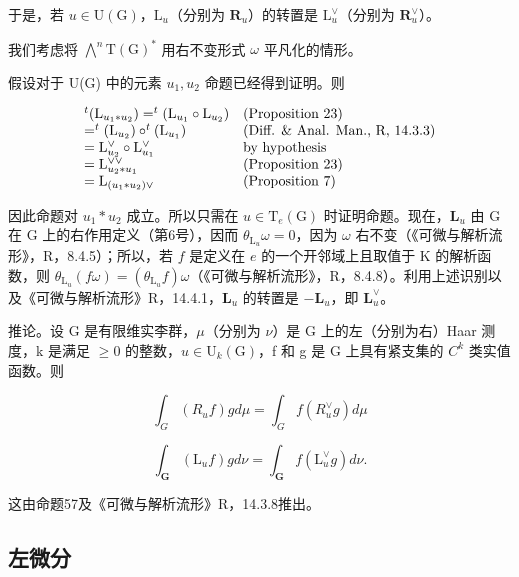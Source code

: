 于是，若 \(u \in \mathrm{U}(\mathrm{G})\)，\(\mathrm{L}_u\)（分别为 \(\mathbf{R}_u\)）的转置是 \(\mathrm{L}_u^\vee\)（分别为 \(\mathbf{R}_u^\vee\)）。

我们考虑将 \(\bigwedge^{n}\mathrm{T}(\mathrm{G})^{*}\) 用右不变形式 \(\omega\) 平凡化的情形。

假设对于 U(G) 中的元素 \(u_{1}, u_{2}\) 命题已经得到证明。则

\[
\begin{array}{l l} ^ {t} (\mathrm{L} _ {u _ {1} * u _ {2}}) = ^ {t} (\mathrm{L} _ {u _ {1}} \circ \mathrm{L} _ {u _ {2}}) & \text {(Proposition 23)} \\ = ^ {t} (\mathrm{L} _ {u _ {2}}) \circ^ {t} (\mathrm{L} _ {u _ {1}}) & \text {(Diff. \& Anal. Man., R, 14.3.3)} \\ = \mathrm{L} _ {u _ {2}} ^ {\vee} \circ \mathrm{L} _ {u _ {1}} ^ {\vee} & \text {by hypothesis} \\ = \mathrm{L} _ {u _ {2} * u _ {1}} ^ {\vee \vee} & \text {(Proposition 23)} \\ = \mathrm{L} _ {(u _ {1} * u _ {2}) \vee} & \text {(Proposition 7)} \end{array}
\]

因此命题对 \(u_{1} * u_{2}\) 成立。所以只需在 \(u \in \mathrm{T}_{e}(\mathrm{G})\) 时证明命题。现在，\(\mathbf{L}_u\) 由 G 在 G 上的右作用定义（第6号），因而 \(\theta_{\mathrm{L}_u}\omega = 0\)，因为 \(\omega\) 右不变（《可微与解析流形》，R，8.4.5）；所以，若 \(f\) 是定义在 \(e\) 的一个开邻域上且取值于 K 的解析函数，则 \(\theta_{\mathrm{L}_u}(f\omega) = (\theta_{\mathrm{L}_u}f)\omega\)（《可微与解析流形》，R，8.4.8）。利用上述识别以及《可微与解析流形》R，14.4.1，\(\mathbf{L}_u\) 的转置是 \(-\mathbf{L}_u\)，即 \(\mathbf{L}_u^\vee\)。

推论。设 G 是有限维实李群，\(\mu\)（分别为 \(\nu\)）是 G 上的左（分别为右）Haar 测度，k 是满足 \(\geqslant0\) 的整数，\(u\in\mathrm{U}_{k}(\mathrm{G})\)，f 和 g 是 G 上具有紧支集的 \(C^{k}\) 类实值函数。则

\[
\int_ {G} \left(R _ {u} f\right) g d \mu = \int_ {G} f (R _ {u} ^ {\vee} g) d \mu
\]

\[
\int_ {\mathbf {G}} \left(\mathrm{L} _ {u} f\right) g d \nu = \int_ {\mathbf {G}} f (\mathrm{L} _ {u} ^ {\vee} g) d \nu .
\]

这由命题57及《可微与解析流形》R，14.3.8推出。

\subsection{左微分}


